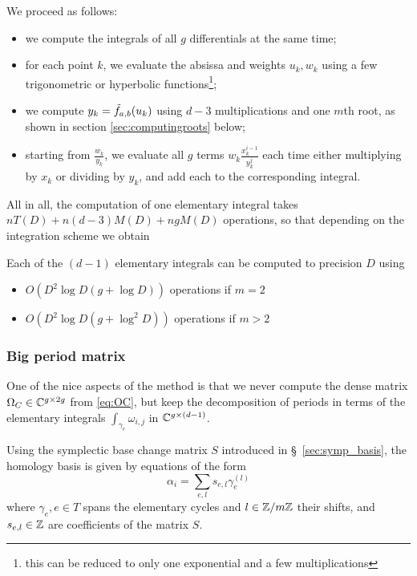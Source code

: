 \documentclass[main.tex]{subfiles}
\begin{document}
   We proceed as follows:
   \begin{itemize}
       \item we compute the integrals of all $g$ differentials at the same time;
   \item for each point $k$, we evaluate the absissa and weights $u_k,w_k$ using
       a few trigonometric or hyperbolic functions\footnote{this can be reduced to only one exponential
       and a few multiplications};
   \item we compute $y_k=\tilde{f}_{a,b}(u_k)$ using $d-3$ multiplications and one $m$th root,
       as shown in section \ref{sec:computingroots} below;
   \item starting from $\frac{w_k}{y_k}$, we evaluate all $g$ terms $w_k\frac{x_k^{i-1}}{y_k^j}$
       each time either multiplying by $x_k$ or dividing by $y_k$, and add each to the corresponding
       integral.
   \end{itemize}

   All in all, the computation of one elementary integral takes $nT(D)+n(d-3)M(D)+ngM(D)$ operations,
   so that depending on the integration scheme we obtain
   \begin{thm}
       \label{thm:complexity_integrals}
       Each of the $(d-1)$ elementary integrals can be computed to precision $D$ using
       \begin{itemize}
           \item $O(D^2\log D (g + \log D))$ operations if $m=2$
           \item $O(D^2\log D (g + \log^2 D))$ operations if $m>2$
       \end{itemize}
   \end{thm}

   \subsubsection{Big period matrix}

   One of the nice aspects of the method is that we never compute
   the dense matrix $\Omega_C\in\mathbb{C}^{g\times 2g}$ from \eqref{eq:OC}, but
   keep the decomposition of periods in terms of the elementary integrals
   $\int_{\gamma_e}\omega_{i,j}$ in $\mathbb{C}^{g\times (d-1)}$.

   Using the symplectic base change matrix $S$ introduced
   in \S~\ref{sec:symp_basis}, the homology basis is given
   by equations of the form
   \begin{equation}
       \label{eq:base_change_cycles}
       \alpha_i = \sum_{e,l} s_{e,l}\gamma_e^{(l)}
   \end{equation}
   where $\gamma_e,e\in T$ spans the elementary cycles
   and $l\in\mathbb{Z}/m\mathbb{Z}$ their shifts,
   and $s_{e,l}\in\mathbb{Z}$ are coefficients of the matrix $S$. 
\end{document}
